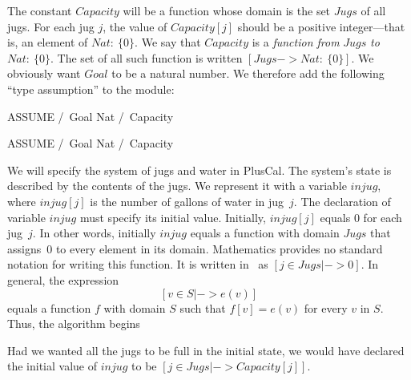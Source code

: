 \documentclass[fleqn,leqno]{article}
\begin{document}
The constant $Capacity$ will be a function whose domain is the set
$Jugs$ of all jugs.  For each jug $j$, the value of $Capacity[j]$
should be a positive integer---that is, an element of $Nat :\: \{0\}$.
We say that $Capacity$ is a \emph{function from} $Jugs$ \emph{to}
$Nat :\: \{0\}$.  The set of all such function is written
 $[Jugs -> Nat :\: \{0\}]$.  We obviously want $Goal$ to be a natural
number.  We therefore add the following ``type assumption'' to the
module:
\begin{twocols}
\begin{notla}
ASSUME /\ Goal \in Nat
       /\ Capacity 
\end{notla}
\begin{tlatex}
%
\end{tlatex}
\midcol
\begin{verbatim*}
ASSUME /\ Goal \in Nat
       /\ Capacity 
\end{verbatim*}
\end{twocols}
We will specify the system of jugs and water in PlusCal.  The system's
state is described by the contents of the jugs.  We represent it with
a variable $injug$, where $injug[j]$ is the number of gallons of water
in jug~$j$.  The declaration of variable $injug$ must specify its
initial value.  Initially, $injug[j]$ equals 0 for each jug~$j$.  In
other words, initially $injug$ equals a function with domain $Jugs$
that assigns~0 to every element in its domain.  Mathematics provides
no standard notation for writing this function.  It is written in
\tlaplus\ as $[j \in Jugs |-> 0]$.  In general, the expression
  \[ [v \in S |-> e(v)] \]
equals a function $f$ with domain $S$ such that $f[v]=e(v)$ for every
$v$ in $S$.  Thus, the algorithm begins
\begin{display}
\begin{nopcal}
--algorithm DieHarder {
  variable injug = [j \in Jugs |-> 0] ;
\end{nopcal}
\begin{tlatex}
%
\end{tlatex}
\end{display}
Had we wanted all the jugs to be full in the initial state, we would have
declared the initial value of $injug$ to be
 $[j \in Jugs |-> Capacity[j]]$.
\end{document}
